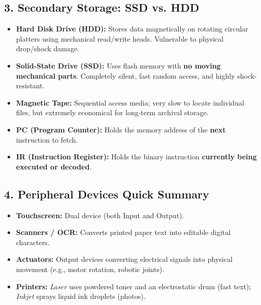 \documentclass[a4paper,11pt]{article}
\begin{document}
\subsection{3. Secondary Storage: SSD vs. HDD}
\begin{itemize}[leftmargin=5mm]
    \item \textbf{Hard Disk Drive (HDD):} Stores data magnetically on rotating circular platters using mechanical read/write heads. Vulnerable to physical drop/shock damage.
    \item \textbf{Solid-State Drive (SSD):} Uses flash memory with \textbf{no moving mechanical parts}. Completely silent, fast random access, and highly shock-resistant.
    \item \textbf{Magnetic Tape:} Sequential access media; very slow to locate individual files, but extremely economical for long-term archival storage.
\end{itemize}

\begin{examalert}
\begin{itemize}[leftmargin=5mm]
    \item \textbf{PC (Program Counter):} Holds the memory address of the \textbf{next} instruction to fetch.
    \item \textbf{IR (Instruction Register):} Holds the binary instruction \textbf{currently being executed or decoded}.
\end{itemize}
\end{examalert}

\subsection{4. Peripheral Devices Quick Summary}
\begin{itemize}[leftmargin=5mm]
    \item \textbf{Touchscreen:} Dual device (both Input and Output).
    \item \textbf{Scanners / OCR:} Converts printed paper text into editable digital characters.
    \item \textbf{Actuators:} Output devices converting electrical signals into physical movement (e.g., motor rotation, robotic joints).
    \item \textbf{Printers:} \textit{Laser} uses powdered toner and an electrostatic drum (fast text); \textit{Inkjet} sprays liquid ink droplets (photos).
\end{itemize}
\end{document}
